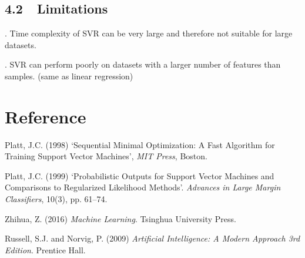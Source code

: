 \documentclass{article}
\begin{document}
\subsection*{4.2 $    $ $  $ Limitations}

. Time complexity of SVR can be very large and therefore not suitable for large datasets.

. SVR can perform poorly on datasets with a larger number of features than samples. (same as linear regression)


\newpage

\section*{Reference}


\noindent Platt, J.C. (1998) `Sequential Minimal Optimization: A Fast Algorithm for Training Support Vector Machines', \textit{MIT Press}, Boston.

\noindent Platt, J.C. (1999) `Probabilistic Outputs for Support Vector Machines and Comparisons to
Regularized Likelihood Methods'. \textit{Advances in Large Margin Classifiers}, 10(3), pp. 61–74.

\noindent Zhihua, Z. (2016) \textit{Machine Learning}. Tsinghua University Press.

\noindent Russell, S.J. and Norvig, P. (2009) \textit{Artificial Intelligence: A Modern Approach 3rd Edition}. Prentice Hall.
\end{document}
